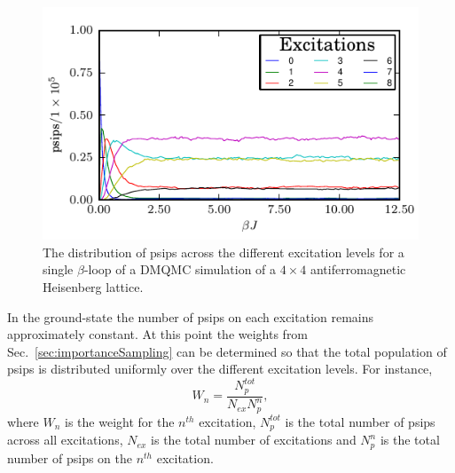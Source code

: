 \begin{figure}[H]
\begin{center}
\includegraphics[width =1\textwidth]{excitations_nois.pdf}
\caption[The distribution of psips across the different excitation levels for a single $\beta$-loop of a DMQMC simulation of a $4\times4$ antiferromagnetic Heisenberg lattice.]{The distribution of psips across the different excitation levels for a single $\beta$-loop of a DMQMC simulation of a $4\times4$ antiferromagnetic Heisenberg lattice.}
\label{fig:excitations_nois}
\end{center}
\end{figure}
In the ground-state the number of psips on each excitation remains approximately constant. At this point the weights from Sec.~\ref{sec:importanceSampling} can be determined so that the total population of psips is distributed uniformly over the different excitation levels. For instance,
\begin{equation}
\label{eq:weightSelection}
W_n = \frac{N_{p}^{tot}}{N_{ex}N_p^{n}},
\end{equation}
where $W_n$ is the weight for the $n^{th}$ excitation, $N_p^{tot}$ is the total number of psips across all excitations,  $N_{ex}$ is the total number of excitations and $N_p^{n}$ is the total number of psips on the $n^{th}$ excitation.

